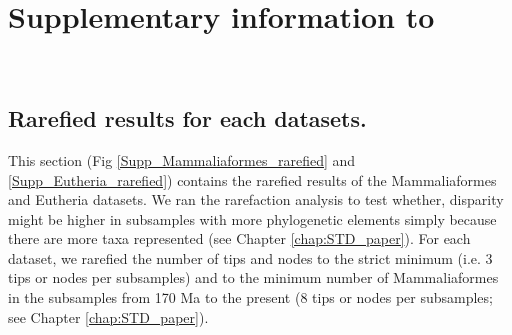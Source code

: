\chapter{Supplementary information to }
\label{chap:Appendix_STD}

\bigskip
\medskip
\begin{center}

 \\
\bigskip
\end{center}

\section{Rarefied results for each datasets.}
This section (Fig \ref{Supp_Mammaliaformes_rarefied} and \ref{Supp_Eutheria_rarefied}) contains the rarefied results of the Mammaliaformes and Eutheria datasets.
We ran the rarefaction analysis to test whether, disparity might be higher in subsamples with more phylogenetic elements simply because there are more taxa represented (see Chapter \ref{chap:STD_paper}).
For each dataset, we rarefied the number of tips and nodes to the strict minimum (i.e. 3 tips or nodes per subsamples) and to the minimum number of Mammaliaformes in the subsamples from 170 Ma to the present (8 tips or nodes per subsamples; see Chapter \ref{chap:STD_paper}).

